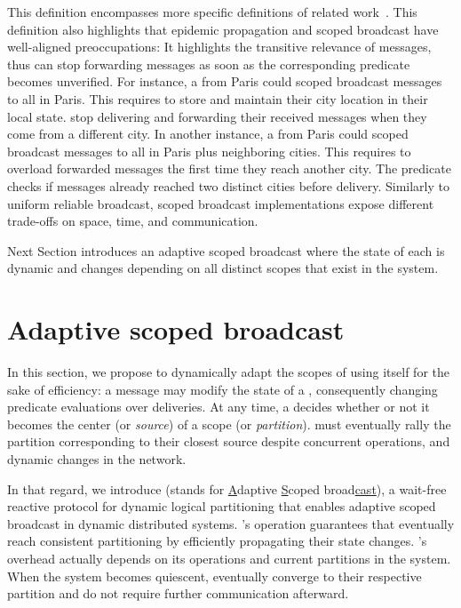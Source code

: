 This definition encompasses more specific definitions of related
work~\cite{hsiao2005scoped, lue2006scoped, wang2015prodiluvian}.  This
definition also highlights that epidemic propagation and scoped
broadcast have well-aligned preoccupations: It highlights the
transitive relevance of messages, thus \processes can stop forwarding
messages as soon as the corresponding predicate becomes unverified.
For instance, a \process from Paris could scoped broadcast messages to
all \processes in Paris. This requires \processes to store and
maintain their city location in their local state. \Processes stop
delivering and forwarding their received messages when they come from
a different city.  In another instance, a \process from Paris could
scoped broadcast messages to all \processes in Paris plus neighboring
cities. This requires \processes to overload forwarded messages the
first time they reach another city. The predicate checks if messages
already reached two distinct cities before delivery. Similarly to
uniform reliable broadcast, scoped broadcast implementations expose
different trade-offs on space, time, and communication.

Next Section introduces an adaptive scoped broadcast where the state
of each \process is dynamic and changes depending on all distinct
scopes that exist in the system.



\section{Adaptive scoped broadcast}
\label{sec:adaptive}

In this section, we propose to dynamically adapt the scopes of \NAMEB
using \NAMEB itself for the sake of efficiency: a \NAMEB message may
modify the state of a \process, consequently changing predicate
evaluations over deliveries.  At any time, a \process decides whether
or not it becomes the center (or \emph{source}) of a scope (or
\emph{partition}). \Processes must eventually rally the partition
corresponding to their closest source despite concurrent operations,
and dynamic changes in the network.

\noindent In that regard, we introduce \NAME (stands for
\underline{A}daptive \underline{S}coped broad\underline{cast}), a
wait-free reactive protocol for dynamic logical partitioning that
enables adaptive scoped broadcast in dynamic distributed
systems. \NAME's operation guarantees that \processes eventually reach
consistent partitioning by efficiently propagating their state
changes. \NAME's overhead actually depends on its operations and
current partitions in the system. When the system becomes quiescent,
\processes eventually converge to their respective partition and do not
require further communication afterward.

